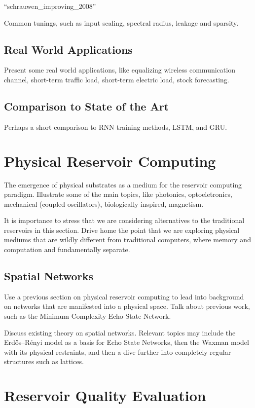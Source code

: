 ``schrauwen_improving_2008''

Common tunings, such as input scaling, spectral radius, leakage and sparsity.

\subsection{Real World Applications}

Present some real world applications, like equalizing wireless communication
channel, short-term traffic load, short-term electric load, stock forecasting.

\subsection{Comparison to State of the Art}

Perhaps a short comparison to RNN training methods, LSTM, and GRU.

\section{Physical Reservoir Computing}

The emergence of physical substrates as a medium for the reservoir computing
paradigm. Illustrate some of the main topics, like photonics, optoeletronics,
mechanical (coupled oscillators), biologically inspired, magnetism.

It is importance to stress that we are considering alternatives to the
traditional reservoirs in this section. Drive home the point that we are
exploring physical mediums that are wildly different from traditional computers,
where memory and computation and fundamentally separate.


\subsection{Spatial Networks}

Use a previous section on physical reservoir computing to lead into background
on networks that are manifested into a physical space. Talk about previous work,
such as the Minimum Complexity Echo State Network.

Discuss existing theory on spatial networks. Relevant topics may include the
Erdős–Rényi model as a basis for Echo State Networks, then the Waxman model with
its physical restraints, and then a dive further into completely regular
structures such as lattices.

\section{Reservoir Quality Evaluation}

